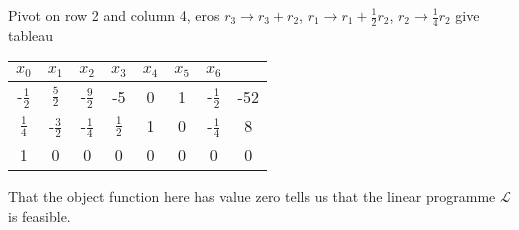 \documentclass[10pt]{article}
\newcommand*{\La}{\mathcal{L}}
\begin{document}
\begin{enumerate}
\begin{enumerate}
\begin{enumerate}
              Pivot on row 2 and column 4, eros $r_3 \rightarrow r_3 + r_2$,
              $r_1 \rightarrow r_1 + \frac{1}{2}r_2$, $r_2 \rightarrow
              \frac{1}{4}r_2$ give tableau

              \begin{tabular}{ c c c c c c c | c }
                $x_0$ & $x_1$ & $x_2$ & $x_3$ & $x_4$ & $x_5$ & $x_6$ & \\
                \hline
                -$\frac{1}{2}$ & $\frac{5}{2}$ & -$\frac{9}{2}$ & -5 & 0 & 1 & -$\frac{1}{2}$ & -52 \\
                $\frac{1}{4}$ & -$\frac{3}{2}$ & -$\frac{1}{4}$ & $\frac{1}{2}$ & 1 & 0 & -$\frac{1}{4}$ & 8 \\
                \hline
                1 & 0 & 0 & 0 & 0 & 0 & 0 & 0 \\
              \end{tabular}
              That the object function here has value zero tells us that the
              linear programme $\La$ is feasible.
        \end{enumerate}
      \end{enumerate}
  \end{enumerate}
\end{document}
